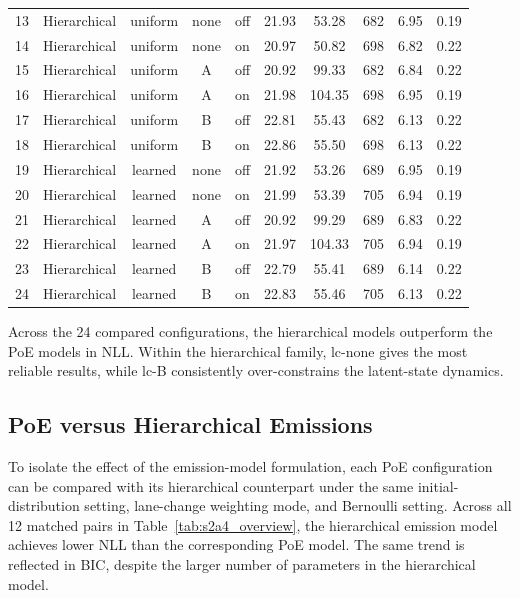 \begin{table}[htbp]
{\begin{tabular}{c l c c c c c c c c}
13 & Hierarchical & uniform & none & off & 21.93 & 53.28 & 682 & 6.95 & 0.19 \\
14 & Hierarchical & uniform & none & on  & 20.97 & 50.82 & 698 & 6.82 & 0.22 \\
15 & Hierarchical & uniform & A    & off & 20.92 & 99.33 & 682 & 6.84 & 0.22 \\
16 & Hierarchical & uniform & A    & on  & 21.98 & 104.35 & 698 & 6.95 & 0.19 \\
17 & Hierarchical & uniform & B    & off & 22.81 & 55.43 & 682 & 6.13 & 0.22 \\
18 & Hierarchical & uniform & B    & on  & 22.86 & 55.50 & 698 & 6.13 & 0.22 \\
19 & Hierarchical & learned & none & off & 21.92 & 53.26 & 689 & 6.95 & 0.19 \\
20 & Hierarchical & learned & none & on  & 21.99 & 53.39 & 705 & 6.94 & 0.19 \\
21 & Hierarchical & learned & A    & off & 20.92 & 99.29 & 689 & 6.83 & 0.22 \\
22 & Hierarchical & learned & A    & on  & 21.97 & 104.33 & 705 & 6.94 & 0.19 \\
23 & Hierarchical & learned & B    & off & 22.79 & 55.41 & 689 & 6.14 & 0.22 \\
24 & Hierarchical & learned & B    & on  & 22.83 & 55.46 & 705 & 6.13 & 0.22 \\
\bottomrule
\end{tabular}%
}
\end{table}

Across the 24 compared configurations, the hierarchical models outperform the PoE models in \ac{NLL}. 
Within the hierarchical family, lc-none gives the most reliable results, while lc-B consistently over-constrains the latent-state dynamics. 

\subsection{PoE versus Hierarchical Emissions}
To isolate the effect of the emission-model formulation, each \ac{PoE} configuration can be compared with its hierarchical counterpart under the same initial-distribution setting, 
lane-change weighting mode, and Bernoulli setting. 
Across all 12 matched pairs in Table~\ref{tab:s2a4_overview}, the hierarchical emission model achieves lower \ac{NLL} than the corresponding \ac{PoE} model. 
The same trend is reflected in \ac{BIC}, despite the larger number of parameters in the hierarchical model.

